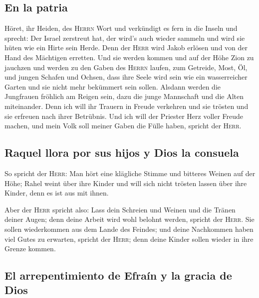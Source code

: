 \hypertarget{en-la-patria}{%
\subsection{En la patria}\label{en-la-patria}}

 Höret, ihr Heiden, des \textsc{Herrn} Wort und
verkündigt es fern in die Inseln und sprecht: Der Israel zerstreut hat,
der wird's auch wieder sammeln und wird sie hüten wie ein Hirte sein
Herde.  Denn der \textsc{Herr} wird Jakob erlösen und von
der Hand des Mächtigen erretten.  Und sie werden kommen
und auf der Höhe Zion zu jauchzen und werden zu den Gaben des
\textsc{Herrn} laufen, zum Getreide, Most, Öl, und jungen Schafen und
Ochsen, dass ihre Seele wird sein wie ein wasserreicher Garten und sie
nicht mehr bekümmert sein sollen.  Alsdann werden die
Jungfrauen fröhlich am Reigen sein, dazu die junge Mannschaft und die
Alten miteinander. Denn ich will ihr Trauern in Freude verkehren und sie
trösten und sie erfreuen nach ihrer Betrübnis.  Und ich
will der Priester Herz voller Freude machen, und mein Volk soll meiner
Gaben die Fülle haben, spricht der \textsc{Herr}.

\hypertarget{raquel-llora-por-sus-hijos-y-dios-la-consuela}{%
\subsection{Raquel llora por sus hijos y Dios la
consuela}\label{raquel-llora-por-sus-hijos-y-dios-la-consuela}}

 So spricht der \textsc{Herr}: Man hört eine klägliche
Stimme und bitteres Weinen auf der Höhe; Rahel weint über ihre Kinder
und will sich nicht trösten lassen über ihre Kinder, denn es ist aus mit
ihnen.

 Aber der \textsc{Herr} spricht also: Lass dein Schreien
und Weinen und die Tränen deiner Augen; denn deine Arbeit wird wohl
belohnt werden, spricht der \textsc{Herr}. Sie sollen wiederkommen aus
dem Lande des Feindes;  und deine Nachkommen haben viel
Gutes zu erwarten, spricht der \textsc{Herr}; denn deine Kinder sollen
wieder in ihre Grenze kommen.

\hypertarget{el-arrepentimiento-de-efrauxedn-y-la-gracia-de-dios}{%
\subsection{El arrepentimiento de Efraín y la gracia de
Dios}\label{el-arrepentimiento-de-efrauxedn-y-la-gracia-de-dios}}

